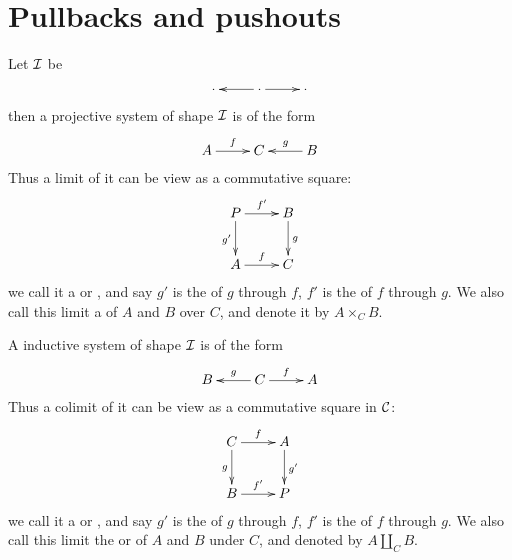 \newpage\section{Pullbacks and pushouts}
  \begin{defn}
    Let ${\cal I}$ be
    \begin{displaymath}
      \xymatrix{
         \cdot&\cdot\ar[l]\ar[r]&\cdot
      }
    \end{displaymath}
    then a projective system of shape ${\cal I}$ is of the form
    \begin{displaymath}
      \xymatrix{
         A\ar[r]^{f}&C&B\ar[l]_{g}
      }
    \end{displaymath}
    Thus a limit of it can be view as a commutative square:
    \begin{displaymath}
      \xymatrix{
         P\ar[r]^{f'}\ar[d]_{g'}&B\ar[d]^{g}\\
         A\ar[r]^{f}&C
      }
    \end{displaymath}
    we call it a  or , and say $g'$ is the  of $g$ through $f$, $f'$ is the  of $f$ through $g$.
    We also call this limit a  of $A$ and $B$ over $C$, and denote it by $A\times_CB$.

    A inductive system of shape ${\cal I}$ is of the form
    \begin{displaymath}
      \xymatrix{
         B&C\ar[l]_{g}\ar[r]^{f}&A
      }
    \end{displaymath}
    Thus a colimit of it can be view as a commutative square in ${\cal C}$:
    \begin{displaymath}
      \xymatrix{
         C\ar[r]^{f}\ar[d]_{g}&A\ar[d]^{g'}\\
         B\ar[r]^{f'}&P
      }
    \end{displaymath}
    we call it a  or , and say $g'$ is the  of $g$ through $f$, $f'$ is the  of $f$ through $g$. We also call this limit the  or  of $A$ and $B$ under $C$, and denoted by $A\amalg_CB$.
  \end{defn}

